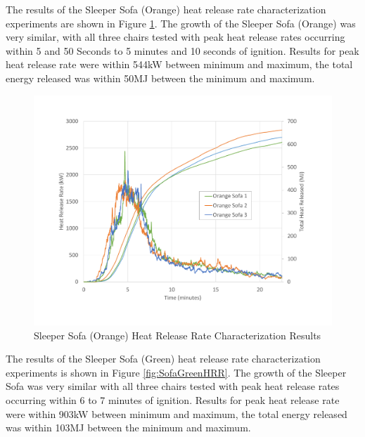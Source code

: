 \documentclass{article}
\begin{document}
\clearpage

The results of the Sleeper Sofa (Orange) heat release rate characterization experiments are shown in Figure \ref{fig:SofaOrangeHRR}. The growth of the Sleeper Sofa (Orange) was very similar, with all three chairs tested with peak heat release rates occurring within 5 and 50 Seconds to 5 minutes and 10 seconds of ignition. Results for peak heat release rate were within 544kW between minimum and maximum, the total energy released was within 50MJ between the minimum and maximum. 

\begin{figure}[H]
	\centering
	\includegraphics[width=\textwidth]{0_Images/Furniture/Sofa_Orange_HRR.pdf}
	\caption{Sleeper Sofa (Orange) Heat Release Rate Characterization Results}
	\label{fig:SofaOrangeHRR}
\end{figure}

\clearpage

The results of the Sleeper Sofa (Green) heat release rate characterization experiments is shown in Figure \ref{fig:SofaGreenHRR}. The growth of the Sleeper Sofa was very similar with all three chairs tested with peak heat release rates occurring within 6 to 7 minutes of ignition. Results for peak heat release rate were within 903kW between minimum and maximum, the total energy released was within 103MJ between the minimum and maximum. 
\end{document}
